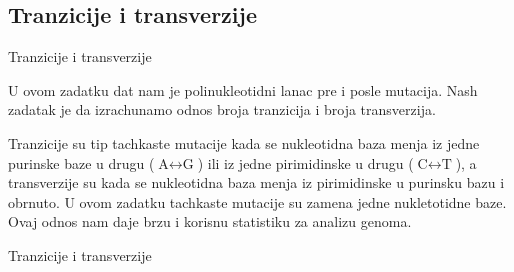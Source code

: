 \documentclass[9pt]{beamer}
\newcommand\eng{\fontencoding{OT1}\fontfamily{\rmdefault}\selectfont}
\newcommand\srb{\fontencoding{OT2}\fontfamily{\rmdefault}\selectfont}
\begin{document}
\subsection{Tranzicije i transverzije}
\begin{frame}{Tranzicije i transverzije}
\begin{block}{}
U ovom zadatku dat nam je polinukleotidni lanac pre i posle mutacija. Nash zadatak je da izrachunamo odnos broja tranzicija i broja transverzija. 
\end{block}
\begin{block}{}
Tranzicije su tip tachkaste mutacije kada se nukleotidna baza menja iz jedne purinske baze u drugu ($\textrm{A} \leftrightarrow \textrm{G}$) ili iz jedne pirimidinske u drugu ($\textrm{C} \leftrightarrow \textrm{T}$), a transverzije su kada se nukleotidna baza menja iz pirimidinske u purinsku bazu i obrnuto. U ovom zadatku tachkaste mutacije su zamena jedne nukletotidne baze. Ovaj odnos nam daje brzu i korisnu statistiku za analizu genoma.
\end{block}
\end{frame}
\begin{frame}{Tranzicije i transverzije}
\begin{minipage}{\textwidth}\eng\srb\end{minipage}
\begin{minipage}{\textwidth}\eng\srb\end{minipage}
\end{frame}
\end{document}
